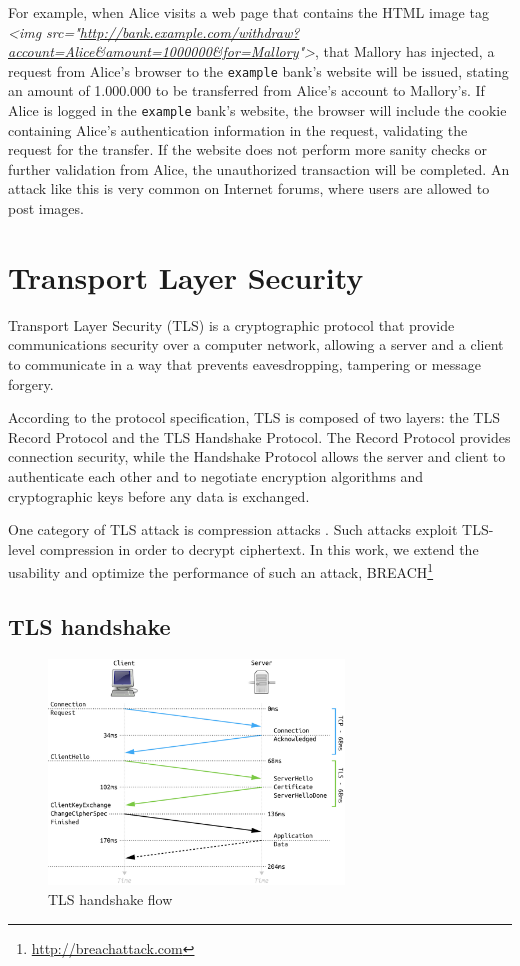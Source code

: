 For example, when Alice visits a web page that contains the HTML image tag
\textit{<img src="\url{http://bank.example.com/withdraw?account=Alice&amount=1000000&for=Mallory}">},
that Mallory has injected, a request from Alice's browser to the
\texttt{example} bank's website will be issued, stating an amount of
1.000.000 to be transferred from Alice's account to Mallory's. If Alice is
logged in the \texttt{example} bank's website, the browser will include the
cookie containing Alice's authentication information in the request, validating
the request for the transfer. If the website does not perform more sanity checks
or further validation from Alice, the unauthorized transaction will be
completed. An attack like this is very common on Internet forums, where users
are allowed to post images.

\section{Transport Layer Security}\label{sec:tls}

Transport Layer Security (TLS) is a cryptographic protocol that provide communications
security over a computer network, allowing a server and a client to communicate in a way
that prevents eavesdropping, tampering or message forgery.

According to the protocol specification, TLS is composed of two layers:
the TLS Record Protocol and the TLS Handshake Protocol. The Record Protocol 
provides connection security, while the Handshake Protocol allows the server 
and client to authenticate each other and to negotiate encryption algorithms 
and cryptographic keys before any data is exchanged.

One category of TLS attack is compression attacks \cite{compression_attacks}. 
Such attacks exploit TLS-level compression in order to decrypt ciphertext. 
In this work, we extend the usability and optimize the performance of such an attack, 
BREACH\footnote{\url{http://breachattack.com}}


\subsection{TLS handshake}

\begin{figure}[H] \caption{TLS handshake flow} \centering
\includegraphics[width=0.7\textwidth]{diagrams/tls_handshake.png}\end{figure}

